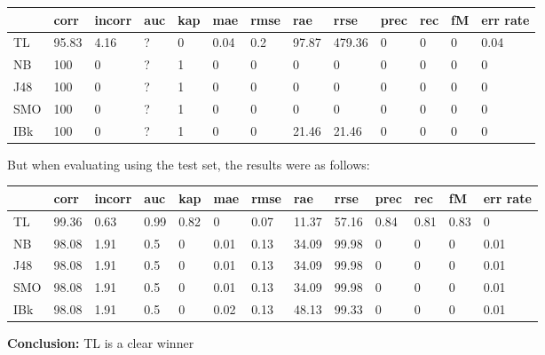 \documentclass[a4paper,12pt, english]{article}
\begin{document}
\begin{small}
\begin{center}
    \begin{tabular}{ | l | l | l | l | l | l | l | l | l | l | l | l | l |}
    \hline
      	& corr & incorr  & auc & kap & mae & rmse & rae & rrse & prec & rec & fM & err rate\\ \hline
      	TL & 95.83 & 4.16 & ? & 0 & 0.04 & 0.2 & 97.87 & 479.36 & 0 & 0 & 0 & 0.04\\ \hline
	NB & 100 & 0 & ? & 1 & 0 & 0 & 0 & 0 & 0 & 0 & 0 & 0\\ \hline
	J48 & 100 & 0 & ? & 1 & 0 & 0 & 0 & 0 & 0 & 0 & 0 & 0\\ \hline
	SMO & 100 & 0 & ? & 1 & 0 & 0 & 0 & 0 & 0 & 0 & 0 & 0\\ \hline
	IBk & 100 & 0 & ? & 1 & 0 & 0 & 21.46 & 21.46 & 0 & 0 & 0 & 0\\ \hline  
    \end{tabular}       
\end{center}
\end{small}

But when evaluating using the test set, the results were as follows:
\begin{small}
\begin{center}
    \begin{tabular}{ | l | l | l | l | l | l | l | l | l | l | l | l | l |}
    \hline
      	& corr & incorr  & auc & kap & mae & rmse & rae & rrse & prec & rec & fM & err rate\\ \hline
      	TL & 99.36 & 0.63 & 0.99 & 0.82 & 0 & 0.07 & 11.37 & 57.16 & 0.84 & 0.81 & 0.83 & 0\\ \hline
	NB & 98.08 & 1.91 & 0.5 & 0 & 0.01 & 0.13 & 34.09 & 99.98 & 0 & 0 & 0 & 0.01\\ \hline
	J48 & 98.08 & 1.91 & 0.5 & 0 & 0.01 & 0.13 & 34.09 & 99.98 & 0 & 0 & 0 & 0.01\\ \hline
	SMO & 98.08 & 1.91 & 0.5 & 0 & 0.01 & 0.13 & 34.09 & 99.98 & 0 & 0 & 0 & 0.01\\ \hline
	IBk & 98.08 & 1.91 & 0.5 & 0 & 0.02 & 0.13 & 48.13 & 99.33 & 0 & 0 & 0 & 0.01\\ \hline  
    \end{tabular}       
\end{center}
\end{small}
\textbf{Conclusion:} TL is a clear winner

\newpage
\end{document}
